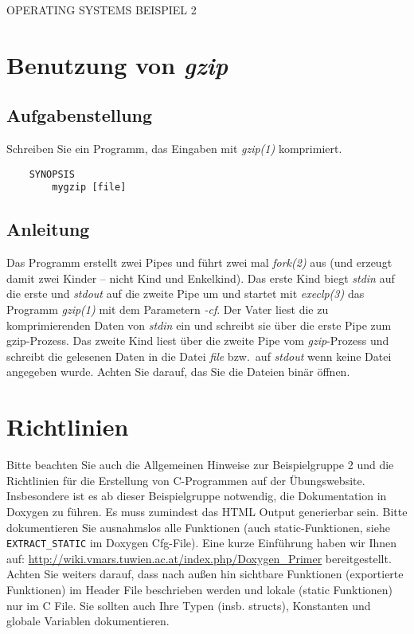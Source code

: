 \documentclass{article}
\begin{document}
\begin{center}
\begin{Large}
OPERATING SYSTEMS BEISPIEL 2
\end{Large}
\end{center}

\section{Benutzung von \emph{gzip}}

\subsection{Aufgabenstellung}
Schreiben Sie ein Programm, das Eingaben mit \emph{gzip(1)} komprimiert.
\begin{verbatim}
    SYNOPSIS
        mygzip [file]
\end{verbatim}


\subsection{Anleitung}  
Das Programm erstellt zwei Pipes und führt zwei mal \emph{fork(2)} aus (und erzeugt damit zwei Kinder – nicht Kind und Enkelkind).
Das erste Kind biegt \emph{stdin} auf die erste und \emph{stdout} auf die zweite Pipe um und startet mit \emph{execlp(3)} das Programm \emph{gzip(1)} mit dem Parametern \emph{-cf}.
Der Vater liest die zu komprimierenden Daten von \emph{stdin} ein und schreibt sie über die erste Pipe zum gzip-Prozess.
Das zweite Kind liest über die zweite Pipe vom \emph{gzip}-Prozess und schreibt die gelesenen Daten in die Datei \emph{file} bzw.\ auf \emph{stdout} wenn keine Datei angegeben wurde.
Achten Sie darauf, das Sie die Dateien binär öffnen.

\section*{Richtlinien}
Bitte beachten Sie auch die Allgemeinen Hinweise zur Beispielgruppe 2 und die Richtlinien f\"ur die Erstellung von C-Programmen auf der \"Ubungswebsite.
Insbesondere ist es ab dieser Beispielgruppe notwendig, die Dokumentation in Doxygen zu f\"uhren. Es muss zumindest das HTML Output generierbar sein. Bitte dokumentieren Sie ausnahmslos alle Funktionen (auch static-Funktionen, siehe \verb|EXTRACT_STATIC| im Doxygen Cfg-File). Eine kurze Einf\"uhrung haben wir Ihnen auf: \url{http://wiki.vmars.tuwien.ac.at/index.php/Doxygen_Primer} bereitgestellt. Achten Sie weiters darauf, dass nach au{\ss}en hin sichtbare Funktionen (exportierte Funktionen) im Header File beschrieben werden und lokale (static Funktionen) nur im C File. Sie sollten auch Ihre Typen (insb. structs), Konstanten und globale Variablen dokumentieren. 
\end{document}
